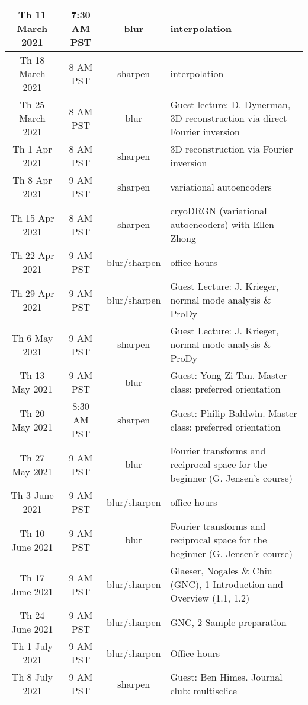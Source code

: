 \documentclass[11pt, oneside]{article}   	%
\begin{document}
\begin{center}
\begin{longtable}{|| c c c p{90mm} ||}
 \hline
Th 11 March 2021 & \tiny{7:30 AM PST} & blur & interpolation  \\ 
 \hline
 Th 18 March 2021 & \tiny{8 AM PST} & sharpen & interpolation  \\ 
 \hline
Th 25 March 2021 & \tiny{8 AM PST} & blur & \tiny{Guest lecture: D. Dynerman, 3D reconstruction via direct Fourier inversion}  \\ 
 \hline
Th 1 Apr 2021 & \tiny{8 AM PST} & sharpen & 3D reconstruction via  Fourier inversion  \\ 
 \hline
Th 8 Apr 2021 & \tiny{9 AM PST} & sharpen & variational autoencoders  \\ 
 \hline
Th 15 Apr 2021 & \tiny{8 AM PST} & sharpen & cryoDRGN (variational autoencoders) with Ellen Zhong  \\ 
 \hline
Th 22 Apr 2021 & \tiny{9 AM PST} & blur/sharpen & office hours  \\ 
 \hline
Th 29 Apr 2021 & \tiny{9 AM PST} & blur/sharpen & \tiny{Guest Lecture: J. Krieger, normal mode analysis \& ProDy}  \\ 
 \hline
Th 6 May 2021 & \tiny{9 AM PST} & sharpen & \tiny{Guest Lecture: J. Krieger, normal mode analysis \& ProDy} \\ 
 \hline
Th 13 May 2021 & \tiny{9 AM PST} & blur & \tiny{Guest: Yong Zi Tan. Master class: preferred orientation}  \\ 
 \hline
Th 20 May 2021 & \tiny{8:30 AM PST} & sharpen & \tiny{Guest: Philip Baldwin. Master class: preferred orientation}  \\ 
 \hline
Th 27 May 2021 & \tiny{9 AM PST} & blur & \tiny{Fourier transforms and reciprocal space for the beginner (G. Jensen's course)}  \\ 
 \hline
Th 3 June 2021 & \tiny{9 AM PST} & blur/sharpen & office hours  \\ 
 \hline
Th 10 June 2021 & \tiny{9 AM PST} & blur & \tiny{Fourier transforms and reciprocal space for the beginner (G. Jensen's course)}  \\
 \hline
Th 17 June 2021& \tiny{9 AM PST} & blur/sharpen & \tiny{Glaeser, Nogales \& Chiu (GNC), 1 Introduction and Overview (1.1, 1.2)}  \\ 
 \hline
Th 24 June 2021& \tiny{9 AM PST} & blur/sharpen & GNC, 2 Sample preparation  \\
 \hline
Th 1 July 2021& \tiny{9 AM PST} & blur/sharpen & Office hours \\ 
 \hline
Th 8 July 2021 & \tiny{9 AM PST} & sharpen & Guest: Ben Himes. Journal club: multisclice  \\ 

\end{longtable}
\end{center}
\end{document}
